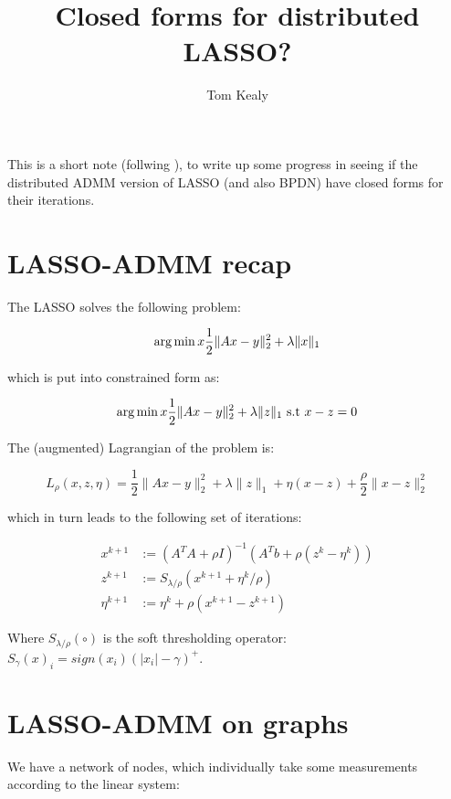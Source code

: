 \documentclass{article}
\title{Closed forms for distributed LASSO?}
\author{Tom Kealy}
\begin{document}
\maketitle

This is a short note (follwing \cite{Boyd2010a}), to write up some progress in seeing if the distributed ADMM version of LASSO (and also BPDN) have closed forms for their iterations.

\section{LASSO-ADMM recap}
The LASSO solves the following problem:

\begin{equation}
\operatorname*{arg\,min}{x} \frac{1}{2}\|Ax-y\|_2^2 + \lambda \|x\|_1
\label{minimisation}
\end{equation}

which is put into constrained form as:

\begin{equation}
\operatorname*{arg\,min}{x} \frac{1}{2}\|Ax-y\|_2^2 + \lambda \|z\|_1 \text{ s.t } x-z=0
\end{equation}

The (augmented) Lagrangian of the problem is:

\begin{equation}
L_\rho\left(x,z,\eta\right) = \frac{1}{2}\|Ax-y\|_2^2 + \lambda \|z\|_1 + \eta\left(x-z\right) + \frac{\rho}{2}\|x-z\|_2^2
\end{equation}

which in turn leads to the following set of iterations:

\begin{align}
x^{k+1} &:= \left(A^TA + \rho I\right)^{-1}\left(A^Tb +\rho\left(z^k - \eta^k\right)\right)\\
z^{k+1} &:= S_{\lambda/\rho}\left(x^{k+1} + \eta^k/\rho\right)
 \\
\eta^{k+1} &:= \eta^{k} + \rho \left(x^{k+1}-z^{k+1}\right)
\label{admm_algo_lasso}
\end{align}

Where \(S_{\lambda/\rho}\left(\circ\right)\) is the soft thresholding operator: \(S_\gamma\left(x\right)_i = sign(x_i)\left(|x_i| - \gamma\right)^+\).

\section{LASSO-ADMM on graphs}
We have a network of nodes, which individually take some measurements according to the linear system:
\end{document}
